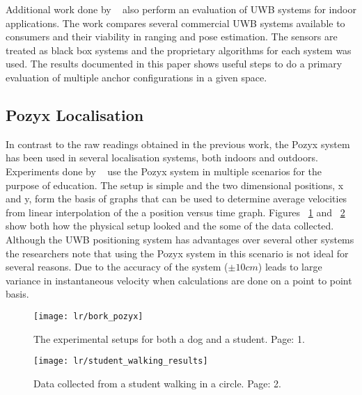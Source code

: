 Additional work done by ~\citet{di2019evaluation} also perform an evaluation of UWB systems for indoor applications.
The work compares several commercial UWB systems available to consumers and their viability in ranging and pose estimation.
The sensors are treated as black box systems and the proprietary algorithms for each system was used.
The results documented in this paper shows useful steps to do a primary evaluation of multiple anchor configurations in a given space.

\subsection{Pozyx Localisation}\label{subsec:pozyx-localisation}
In contrast to the raw readings obtained in the previous work, the Pozyx system has been used in several localisation systems, both indoors and outdoors.
Experiments done by ~\citet{destefano2019using} use the Pozyx system in multiple scenarios for the purpose of education.
The setup is simple and the two dimensional positions, x and y, form the basis of  graphs that can be used to determine average velocities from linear interpolation of the a position versus time graph.
Figures ~\ref{fig:bpozyx} and ~\ref{fig:stupozyx} show both how the physical setup looked and the some of the data collected.
Although the UWB positioning system has advantages over several other systems the researchers note that using the Pozyx system in this scenario is not ideal for several reasons.
Due to the accuracy of the system ($\pm10cm$) leads to large variance in instantaneous velocity when calculations are done on a point to point basis.

\begin{figure}[h!]
    \centering
    \texttt{[image: lr/bork\_pozyx]}
    \caption{The experimental setups for both a dog and a student. \cite{destefano2019using} Page: 1.}
    \label{fig:bpozyx}
\end{figure}

\begin{figure}[h!]
    \centering
    \texttt{[image: lr/student\_walking\_results]}
    \caption{Data collected from a student walking in a circle. \cite{destefano2019using} Page: 2.}
    \label{fig:stupozyx}
\end{figure}

